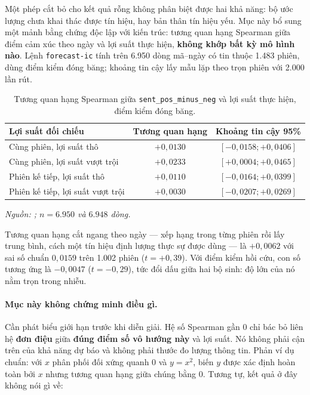 Một phép cắt bỏ cho kết quả rỗng không phân biệt được hai khả năng: bộ ước lượng chưa khai
thác được tín hiệu, hay bản thân tín hiệu yếu. Mục này bổ sung một mảnh bằng chứng độc lập
với kiến trúc: tương quan hạng Spearman giữa điểm cảm xúc theo ngày và lợi suất thực hiện,
\textbf{không khớp bất kỳ mô hình nào}. Lệnh \texttt{forecast-ic} tính trên 6.950 dòng
mã--ngày có tin thuộc 1.483 phiên, dùng điểm kiểm đóng băng; khoảng tin cậy lấy mẫu lặp
theo trọn phiên với 2.000 lần rút.

\begin{table}[H]
  \centering
  \caption{Tương quan hạng Spearman giữa \texttt{sent\_pos\_minus\_neg} và lợi suất thực hiện, điểm kiểm đóng băng.}
  \label{tab:kq-ic}
  \begin{tabular}{l c c}
    \toprule
    Lợi suất đối chiếu & Tương quan hạng & Khoảng tin cậy 95\% \\
    \midrule
    Cùng phiên, lợi suất thô & $+0{,}0130$ & $[-0{,}0158; +0{,}0406]$ \\
    Cùng phiên, lợi suất vượt trội & $+0{,}0233$ & $[+0{,}0004; +0{,}0465]$ \\
    Phiên kế tiếp, lợi suất thô & $+0{,}0110$ & $[-0{,}0164; +0{,}0399]$ \\
    Phiên kế tiếp, lợi suất vượt trội & $+0{,}0030$ & $[-0{,}0207; +0{,}0269]$ \\
    \bottomrule
  \end{tabular}
\noindent\textit{Nguồn: ; $n = 6.950$ và $6.948$ dòng.}
\end{table}

Tương quan hạng cắt ngang theo ngày --- xếp hạng trong từng phiên rồi lấy trung bình, cách
một tín hiệu định lượng thực sự được dùng --- là $+0{,}0062$ với sai số chuẩn $0{,}0159$
trên 1.002 phiên ($t = +0{,}39$). Với điểm kiểm hồi cứu, con số tương ứng là $-0{,}0047$
($t = -0{,}29$), tức đổi dấu giữa hai bộ sinh: độ lớn của nó nằm trọn trong nhiễu.

\paragraph{Mục này không chứng minh điều gì.}
Cần phát biểu giới hạn trước khi diễn giải. Hệ số Spearman gần 0 chỉ bác bỏ liên hệ
\textbf{đơn điệu} giữa \textbf{đúng điểm số vô hướng này} và lợi suất. Nó không phải cận
trên của khả năng dự báo và không phải thước đo lượng thông tin. Phản ví dụ chuẩn: với
$x$ phân phối đối xứng quanh 0 và $y = x^2$, biến $y$ được xác định hoàn toàn bởi $x$
nhưng tương quan hạng giữa chúng bằng 0. Tương tự, kết quả ở đây không nói gì về:


